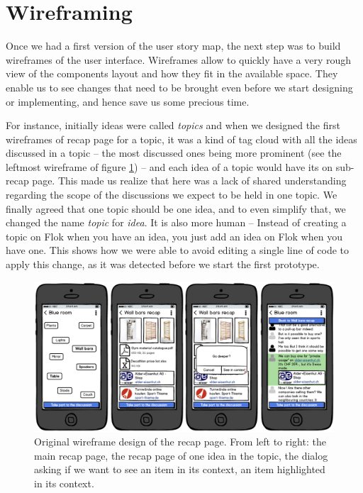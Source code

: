\documentclass[a4paper,12pt,twoside]{article}
\begin{document}
\clearpage

\section{Wireframing}
Once we had a first version of the user story map, the next step was to build wireframes of the user interface.
Wireframes allow to quickly have a very rough view of the components layout and how they fit in the available space.
They enable us to see changes that need to be brought even before we start designing or implementing, and hence save us some precious time.

For instance, initially ideas were called \emph{topics} and when we designed the first wireframes of recap page for a topic, it was a kind of tag cloud with all the ideas discussed in a topic – the most discussed ones being more prominent (see the leftmost wireframe of figure \ref{fig.originalRecapWireframes}) – and each idea of a topic would have its on sub-recap page.
This made us realize that here was a lack of shared understanding regarding the scope of the discussions we expect to be held in one topic.
We finally agreed that one topic should be one idea, and to even simplify that, we changed the name \emph{topic} for \emph{idea}.
It is also more human – Instead of creating a topic on Flok when you have an idea, you just add an idea on Flok when you have one.
This shows how we were able to avoid editing a single line of code to apply this change, as it was detected before we start the first prototype.

\begin{figure}[!htb]
    \centering
    \includegraphics[width=\textwidth]{images/originalRecapWireframes.png}
    \caption{Original wireframe design of the recap page. From left to right: the main recap page, the recap page of one idea in the topic, the dialog asking if we want to see an item in its context, an item highlighted in its context.}
    \label{fig.originalRecapWireframes}
\end{figure}
\end{document}
